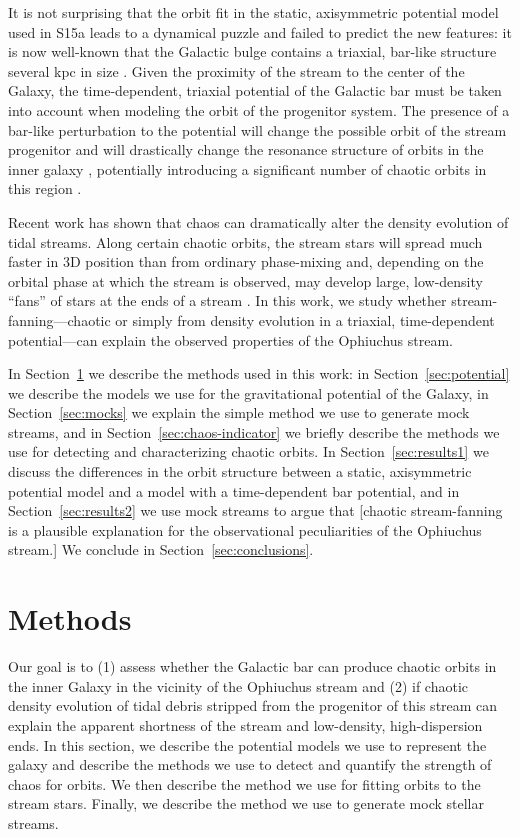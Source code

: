 \documentclass[letterpaper,12pt,preprint]{aastex}
\begin{document}
It is not surprising that the orbit fit in the static, axisymmetric potential model used in S15a leads to a dynamical puzzle and failed to predict the new features: it is now well-known that the Galactic bulge contains a triaxial, bar-like structure several kpc in size \citep[e.g.,][]{blitzXX, wegg13, MANY}. Given the proximity of the stream to the center of the Galaxy, the time-dependent, triaxial potential of the Galactic bar must be taken into account when modeling the orbit of the progenitor system. The presence of a bar-like perturbation to the potential will change the possible orbit of the stream progenitor and will drastically change the resonance structure of orbits in the inner galaxy \citep{athanassoula, portail15b MANY}, potentially introducing a significant number of chaotic orbits in this region \citep{weinberg15}.

Recent work has shown that chaos can dramatically alter the density evolution of tidal streams. Along certain chaotic orbits, the stream stars will spread much faster in 3D position than from ordinary phase-mixing and, depending on the orbital phase at which the stream is observed, may develop large, low-density ``fans'' of stars at the ends of a stream \citep{apw15-chaos}. In this work, we study whether stream-fanning---chaotic or simply from density evolution in a triaxial, time-dependent potential---can explain the observed properties of the Ophiuchus stream. 

In Section~\ref{sec:method} we describe the methods used in this work: in Section~\ref{sec:potential} we describe the models we use for the gravitational potential of the Galaxy, in Section~\ref{sec:mocks} we explain the simple method we use to generate mock streams, and in Section~\ref{sec:chaos-indicator} we briefly describe the methods we use for detecting and characterizing chaotic orbits. In Section~\ref{sec:results1} we discuss the differences in the orbit structure between a static, axisymmetric potential model and a model with a time-dependent bar potential, and in Section~\ref{sec:results2} we use mock streams to argue that [chaotic stream-fanning is a plausible explanation for the observational peculiarities of the Ophiuchus stream.] We conclude in Section~\ref{sec:conclusions}.

\section{Methods}\label{sec:method}

Our goal is to (1) assess whether the Galactic bar can produce chaotic orbits in the inner Galaxy in the vicinity of the Ophiuchus stream and (2) if chaotic density evolution of tidal debris stripped from the progenitor of this stream can explain the apparent shortness of the stream and low-density, high-dispersion ends. In this section, we describe the potential models we use to represent the galaxy and describe the methods we use to detect and quantify the strength of chaos for orbits. We then describe the method we use for fitting orbits to the stream stars. Finally, we describe the method we use to generate mock stellar streams. 
\end{document}
